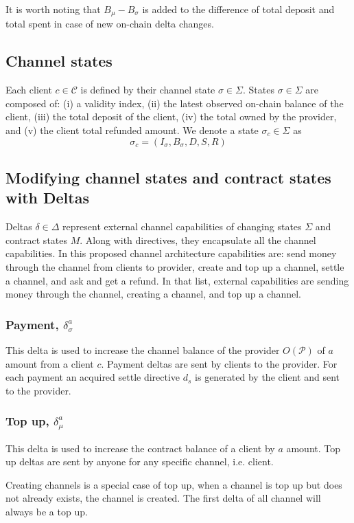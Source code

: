 \documentclass{llncs}
\begin{document}
It is worth noting that $B_\mu - B_\sigma$ is added to the difference of total deposit and total spent in case of new on-chain delta changes.

\subsection{Channel states} Each client $c \in \mathcal{C}$ is defined by their channel state $\sigma \in \Sigma$. States $\sigma \in \Sigma$ are composed of: (i) a validity index, (ii) the latest observed on-chain balance
of the client, (iii) the total deposit of the client, (iv) the total owned by the provider, and (v) the client total refunded amount. We denote a state $\sigma_c \in \Sigma$ as
$$\sigma_c = (I_\sigma, B_\sigma, D, S,R)$$

\subsection{Modifying channel states and contract states with Deltas} Deltas $\delta \in \Delta$ represent external channel capabilities of changing states $\Sigma$ and contract states $M$. Along with directives, they encapsulate all the channel capabilities. In this proposed channel architecture capabilities are: send money through the channel from clients to provider, create and top up a channel, settle a channel, and ask and get a refund. In that list, external capabilities are sending money through the channel, creating a channel, and top up a channel.

\subsubsection{Payment, $\delta_\sigma^a$} This delta is used to increase the channel balance of the provider $O(\mathcal{P})$ of $a$ amount from a client $c$. Payment deltas are sent by clients to the provider. For each payment an acquired settle directive $d_s$ is generated by the client and sent to the provider.

\subsubsection{Top up, $\delta_\mu^a$} This delta is used to increase the contract balance of a client by $a$ amount. Top up deltas are sent by anyone for any specific channel, i.e. client.

Creating channels is a special case of top up, when a channel is top up but does not already exists, the channel is created. The first delta of all channel will always be a top up.
\end{document}
